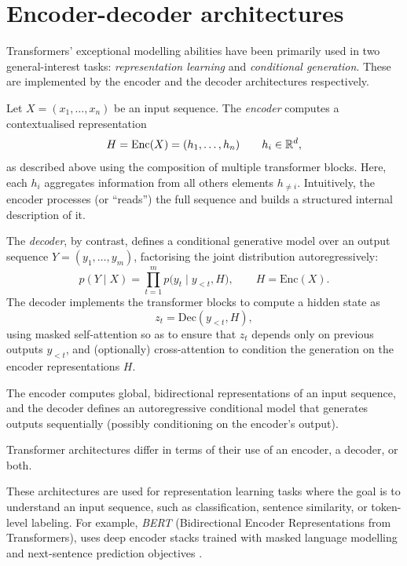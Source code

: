 \section{Encoder-decoder architectures}

Transformers' exceptional modelling abilities have been primarily used in two general-interest tasks: \emph{representation learning} and \emph{conditional
generation}. These are implemented by the encoder and the decoder architectures respectively.

Let $X = (x_1,\dots,x_n)$ be an input sequence. The \emph{encoder}
computes a contextualised representation
\[
H = \mathrm{Enc}(X) = (h_1,\dots,h_n)
\qquad h_i \in {\mathbb R}^{d},
\]
as described above using the composition of multiple transformer blocks. Here, each $h_i$ aggregates
information from all others elements $h_{\neq i}$. Intuitively, the encoder processes (or “reads”) the full
sequence and builds a structured internal description of it.

The \emph{decoder}, by contrast, defines a conditional generative model over an output sequence $Y = (y_1,\dots,y_m)$, factorising the joint distribution autoregressively:
\[
p(Y \mid X)
=
\prod_{t=1}^m
p\big(y_t \mid y_{<t}, H\big),
\qquad H = \mathrm{Enc}(X).
\]
The decoder implements the transformer blocks to compute a hidden state as
\[
z_t = \mathrm{Dec}(y_{<t}, H),
\]
using masked self-attention so as to ensure that $z_t$ depends only on previous outputs $y_{<t}$, and (optionally) cross-attention to condition the generation on the encoder representations $H$.

\begin{remark}
    The encoder computes global, bidirectional representations of an input sequence, and the decoder defines an autoregressive conditional model that
    generates outputs sequentially (possibly conditioning on the encoder's output).
\end{remark}

Transformer architectures differ in terms of their use of an encoder, a decoder, or both.


\begin{example}
    These architectures are used for representation learning tasks where the goal is to understand an input sequence, such as classification, sentence similarity, or token-level labeling. For example, \emph{BERT} (Bidirectional Encoder Representations from Transformers), uses deep encoder stacks trained with masked language modelling and next-sentence prediction objectives \cite{devlin2018bert}. 
\end{example}


